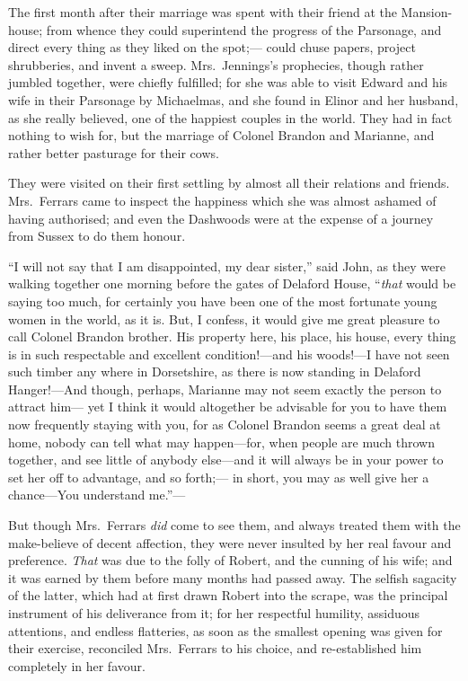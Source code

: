 The first month after their marriage was spent
with their friend at the Mansion-house; from whence
they could superintend the progress of the Parsonage,
and direct every thing as they liked on the spot;---%
could chuse papers, project shrubberies, and invent a sweep.
Mrs.\ Jennings's prophecies, though rather jumbled together,
were chiefly fulfilled; for she was able to visit Edward
and his wife in their Parsonage by Michaelmas, and she
found in Elinor and her husband, as she really believed,
one of the happiest couples in the world.  They had
in fact nothing to wish for, but the marriage of Colonel
Brandon and Marianne, and rather better pasturage for
their cows.

They were visited on their first settling by almost
all their relations and friends.  Mrs.\ Ferrars came
to inspect the happiness which she was almost ashamed
of having authorised; and even the Dashwoods were at
the expense of a journey from Sussex to do them honour.

``I will not say that I am disappointed, my dear sister,''
said John, as they were walking together one morning before
the gates of Delaford House, ``\emph{that} would be saying too much,
for certainly you have been one of the most fortunate young
women in the world, as it is.  But, I confess, it would
give me great pleasure to call Colonel Brandon brother.
His property here, his place, his house, every thing is in
such respectable and excellent condition!---and his woods!---I
have not seen such timber any where in Dorsetshire, as there
is now standing in Delaford Hanger!---And though, perhaps,
Marianne may not seem exactly the person to attract him---%
yet I think it would altogether be advisable for you to
have them now frequently staying with you, for as Colonel
Brandon seems a great deal at home, nobody can tell what
may happen---for, when people are much thrown together,
and see little of anybody else---and it will always be
in your power to set her off to advantage, and so forth;---%
in short, you may as well give her a chance---You understand
me.''---%

But though Mrs.\ Ferrars \emph{did} come to see them, and always
treated them with the make-believe of decent affection,
they were never insulted by her real favour and preference.
\emph{That} was due to the folly of Robert, and the cunning
of his wife; and it was earned by them before many months
had passed away.  The selfish sagacity of the latter,
which had at first drawn Robert into the scrape,
was the principal instrument of his deliverance from it;
for her respectful humility, assiduous attentions,
and endless flatteries, as soon as the smallest opening
was given for their exercise, reconciled Mrs.\ Ferrars
to his choice, and re-established him completely in
her favour.

